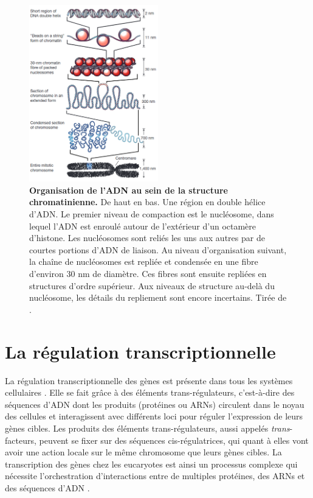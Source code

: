 \begin{figure}[h]
    \centering
    \includegraphics[width=0.5\textwidth, page=1] {figures/introduction/fig4.png}
    \caption[Organisation de l'\acrshort{ADN} au sein de la structure chromatinienne.]{
    \textbf{Organisation de l'\acrshort{ADN} au sein de la structure chromatinienne.}
     De haut en bas. Une région en double hélice d'\acrshort{ADN}. Le premier niveau de compaction est le nucléosome, dans lequel l'\acrshort{ADN} est enroulé autour de l'extérieur d'un octamère d'histone. Les nucléosomes sont reliés les uns aux autres par de courtes portions d'\acrshort{ADN} de liaison. Au niveau d'organisation suivant, la chaîne de nucléosomes est repliée et condensée en une fibre d'environ 30 nm de diamètre. Ces fibres sont ensuite repliées en structures d'ordre supérieur. Aux niveaux de structure au-delà du nucléosome, les détails du repliement sont encore incertains. Tirée de \citep{felsenfeld_controlling_2003}. \\
    }
    \label{fig:Fig4}
\end{figure} 

\section{La régulation transcriptionnelle}
\label{sec:reg-transcription}

La régulation transcriptionnelle des gènes est présente dans tous les systèmes cellulaires \citep{ptashne_regulation_2005}. Elle se fait grâce à des éléments \gls{trans}-régulateurs, c'est-à-dire des séquences d’ADN dont les produits (protéines ou \acrshort{ARN}s) circulent dans le noyau des cellules et interagissent avec différents loci pour réguler l’expression de leurs gènes cibles. Les produits des éléments \gls{trans}-régulateurs, aussi appelés \textit{trans}-facteurs, peuvent se fixer sur des séquences \gls{cis}-régulatrices, qui quant à elles vont avoir une action locale sur le même chromosome que leurs gènes cibles. La transcription des gènes chez les eucaryotes est ainsi un processus complexe qui nécessite l’orchestration d’interactions entre de multiples protéines, des \acrshort{ARN}s et des séquences d’ADN \citep{maston_transcriptional_2006,ong_enhancer_2011}.

